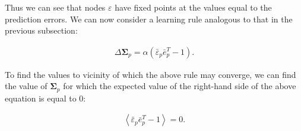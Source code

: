 Thus we can see that nodes $\varepsilon$ have fixed points at the values equal to the prediction errors. We can now consider a learning rule analogous to that in the previous subsection: 

\begin{equation*}
    \begin{aligned}
\Delta \mathbf{\Sigma}_p = \alpha(\bar{\varepsilon}_p \bar{e}_p^T - 1). 
    \end{aligned}
\end{equation*}

To find the values to vicinity of which the above rule may converge, we can find the value of $\mathbf{\Sigma}_p$ for which the expected value of the right-hand side of the above equation is equal to $0$: 

\begin{equation*}
    \begin{aligned}
\left<\bar{\varepsilon}_p \bar{e}_p^T - 1 \right> = 0.
    \end{aligned}
\end{equation*}
